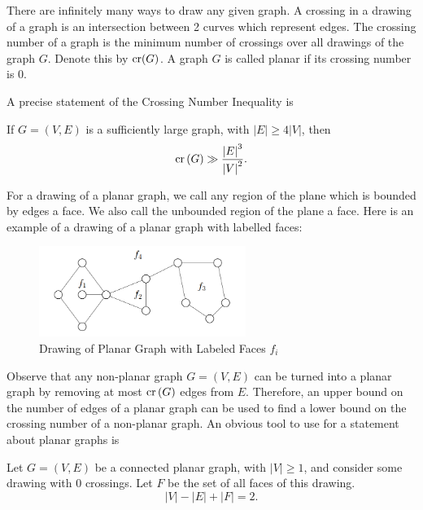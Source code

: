\documentclass[12pt]{amsart}
\begin{document}
There are infinitely many ways to draw any given graph. A crossing in a drawing
of a graph is an intersection between 2 curves which represent edges. The 
crossing number of a graph is the minimum number of crossings
over all drawings of the graph \(G\). Denote this by
\(\operatorname{cr}(G)\). A graph \(G\) is called planar if its crossing number is 0.

A precise statement of the Crossing Number Inequality is

\begin{theorem}\label{thm:crossing-number-inequality}
    If \(G = (V,E)\) is a sufficiently large graph, with \(\left\lvert E \right\rvert \geq 4 \left\lvert V \right\rvert \),
    then
    \[
        \operatorname{cr}\left( G \right) \gg \frac{\left\lvert E \right\rvert ^{3} }{\left\lvert V \right\rvert ^{2}}  
    .\]
\end{theorem}

For a drawing of a planar graph, we call any region of the plane which is bounded by edges a face. We also call
the unbounded region of the plane a face. Here is an example of a drawing of a planar
graph with labelled faces:

\begin{figure}[h]
    \centering
    \includegraphics[width=0.6\textwidth]{faceimage.png}
    \caption{Drawing of Planar Graph with Labeled Faces \(f_{i} \)}
\end{figure}

Observe that any non-planar graph \(G = (V,E)\) can be turned into a planar graph by removing at most
\(\operatorname{cr}\left( G \right) \) edges from \(E\). Therefore, an upper bound on the number of edges of a
planar graph can be used to find a lower bound on the crossing number of a non-planar graph.
An obvious tool to use for a statement about planar graphs is

\begin{theorem}\label{thm:euler-formula-graphs}
Let \(G = (V,E)\) be a connected planar graph, with \(\left\lvert V \right\rvert \geq 1\), and consider some drawing with 0 crossings.
Let \(F\) be the set of all faces of this drawing.
\[
    \left\lvert V \right\rvert - \left\lvert E \right\rvert + \left\lvert F \right\rvert = 2
.\]
\end{theorem}
\end{document}
